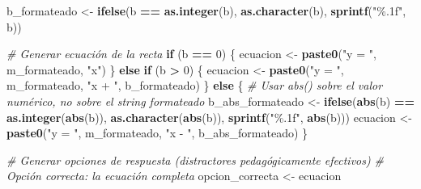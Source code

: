 \documentclass[
]{article}
\newenvironment{Shaded}{\begin{snugshade}}{\end{snugshade}}
\newcommand{\CommentTok}[1]{\textcolor[rgb]{0.56,0.35,0.01}{\textit{#1}}}
\newcommand{\ControlFlowTok}[1]{\textcolor[rgb]{0.13,0.29,0.53}{\textbf{#1}}}
\newcommand{\DecValTok}[1]{\textcolor[rgb]{0.00,0.00,0.81}{#1}}
\newcommand{\FunctionTok}[1]{\textcolor[rgb]{0.13,0.29,0.53}{\textbf{#1}}}
\newcommand{\NormalTok}[1]{#1}
\newcommand{\OtherTok}[1]{\textcolor[rgb]{0.56,0.35,0.01}{#1}}
\newcommand{\SpecialCharTok}[1]{\textcolor[rgb]{0.81,0.36,0.00}{\textbf{#1}}}
\newcommand{\StringTok}[1]{\textcolor[rgb]{0.31,0.60,0.02}{#1}}
\begin{document}
\begin{Shaded}
\begin{Highlighting}[]
\NormalTok{  b\_formateado }\OtherTok{\textless{}{-}} \FunctionTok{ifelse}\NormalTok{(b }\SpecialCharTok{==} \FunctionTok{as.integer}\NormalTok{(b), }\FunctionTok{as.character}\NormalTok{(b), }\FunctionTok{sprintf}\NormalTok{(}\StringTok{"\%.1f"}\NormalTok{, b))}
  
  \CommentTok{\# Generar ecuación de la recta}
  \ControlFlowTok{if}\NormalTok{ (b }\SpecialCharTok{==} \DecValTok{0}\NormalTok{) \{}
\NormalTok{    ecuacion }\OtherTok{\textless{}{-}} \FunctionTok{paste0}\NormalTok{(}\StringTok{"y = "}\NormalTok{, m\_formateado, }\StringTok{"x"}\NormalTok{)}
\NormalTok{  \} }\ControlFlowTok{else} \ControlFlowTok{if}\NormalTok{ (b }\SpecialCharTok{\textgreater{}} \DecValTok{0}\NormalTok{) \{}
\NormalTok{    ecuacion }\OtherTok{\textless{}{-}} \FunctionTok{paste0}\NormalTok{(}\StringTok{"y = "}\NormalTok{, m\_formateado, }\StringTok{"x + "}\NormalTok{, b\_formateado)}
\NormalTok{  \} }\ControlFlowTok{else}\NormalTok{ \{}
    \CommentTok{\# Usar abs() sobre el valor numérico, no sobre el string formateado}
\NormalTok{    b\_abs\_formateado }\OtherTok{\textless{}{-}} \FunctionTok{ifelse}\NormalTok{(}\FunctionTok{abs}\NormalTok{(b) }\SpecialCharTok{==} \FunctionTok{as.integer}\NormalTok{(}\FunctionTok{abs}\NormalTok{(b)), }
                               \FunctionTok{as.character}\NormalTok{(}\FunctionTok{abs}\NormalTok{(b)), }
                               \FunctionTok{sprintf}\NormalTok{(}\StringTok{"\%.1f"}\NormalTok{, }\FunctionTok{abs}\NormalTok{(b)))}
\NormalTok{    ecuacion }\OtherTok{\textless{}{-}} \FunctionTok{paste0}\NormalTok{(}\StringTok{"y = "}\NormalTok{, m\_formateado, }\StringTok{"x {-} "}\NormalTok{, b\_abs\_formateado)}
\NormalTok{  \}}
  
  \CommentTok{\# Generar opciones de respuesta (distractores pedagógicamente efectivos)}
  \CommentTok{\# Opción correcta: la ecuación completa}
\NormalTok{  opcion\_correcta }\OtherTok{\textless{}{-}}\NormalTok{ ecuacion}
  

\end{Highlighting}
\end{Shaded}
\end{document}
